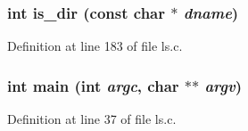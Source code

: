 \subsubsection[{is\_\-dir}]{\setlength{\rightskip}{0pt plus 5cm}int is\_\-dir (const char $\ast$ {\em dname})}\label{ls_8c_a7791f3db8a56d9f73ddbd1a774023873}


Definition at line 183 of file ls.c.

\subsubsection[{main}]{\setlength{\rightskip}{0pt plus 5cm}int main (int {\em argc}, \/  char $\ast$$\ast$ {\em argv})}\label{ls_8c_a3c04138a5bfe5d72780bb7e82a18e627}


Definition at line 37 of file ls.c.

